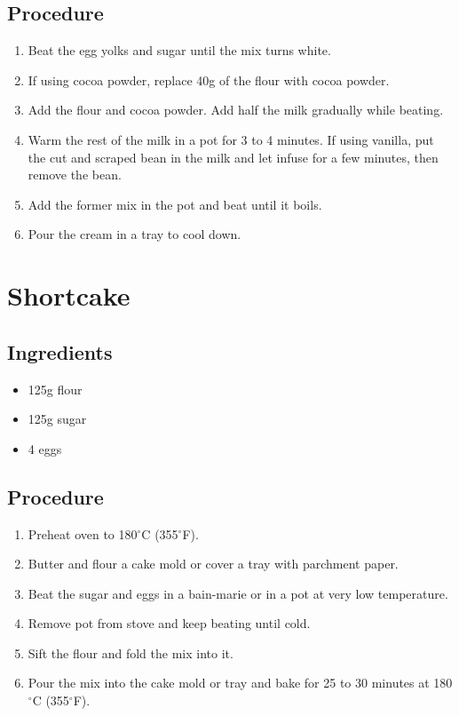 \documentclass[10pt]{book}
\newcommand{\degree}{$^\circ$}
\begin{document}
\subsection*{Procedure}
	\begin{enumerate}
		\item Beat the egg yolks and sugar until the mix turns white.
		\item If using cocoa powder, replace 40g of the flour with cocoa powder.
		\item Add the flour and cocoa powder. Add half the milk gradually while beating.
		\item Warm the rest of the milk in a pot for 3 to 4 minutes. If using vanilla, put the cut and scraped bean in the milk and let infuse for a few minutes, then remove the bean.
		\item Add the former mix in the pot and beat until it boils.
		\item Pour the cream in a tray to cool down.
	\end{enumerate}

\newpage\section*{Shortcake}
\subsection*{Ingredients}
	\begin{itemize}
		\item 125g flour
		\item 125g sugar
		\item 4 eggs
	\end{itemize}
\subsection*{Procedure}
	\begin{enumerate}
		\item Preheat oven to 180{\degree}C (355{\degree}F).
		\item Butter and flour a cake mold or cover a tray with parchment paper.
		\item Beat the sugar and eggs in a bain-marie or in a pot at very low temperature.
		\item Remove pot from stove and keep beating until cold.
		\item Sift the flour and fold the mix into it.
		\item Pour the mix into the cake mold or tray and bake for 25 to 30 minutes at 180{\degree}C (355{\degree}F).
	\end{enumerate}
\newpage
\end{document}
